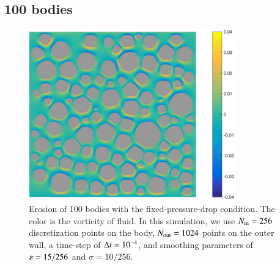 \documentclass[preprint, 10pt]{elsarticle}
\begin{document}
\subsection{100 bodies}
\begin{figure}[H]
\begin{center}
\includegraphics[width = 0.8\textwidth]{./figs/100b_50}
\caption{\label{fig:Eroding100vort} Erosion of 100 bodies with the
  fixed-pressure-drop condition. The color is the vorticity of fluid. In
  this simulation, we use $N_{\mathrm{in}} = 256$ discretization points on the
  body, $N_{\mathrm{out}} = 1024$ points on the outer wall, a time-step of
  $\Delta t=10^{-4}$, and smoothing parameters of $\varepsilon= 15/256$ and
  $\sigma=10/256$.}
\end{center}
\end{figure}
\end{document}

